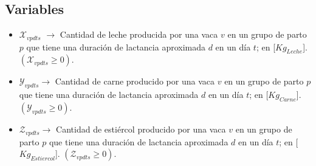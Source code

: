 

\subsection{Variables}
\begin{itemize}
    \item \textbf{$\mathcal{X}_{vpdts}$} $\longrightarrow$ Cantidad de leche producida por una vaca $v$ en un grupo de parto $p$ que tiene una duración de lactancia aproximada $d$ en un día $t$; en [$Kg_{Leche}$]. $\left(\mathcal{X}_{vpdts}\geq 0 \right)$.
    \item \textbf{$\mathcal{Y}_{vpdts}$}$\longrightarrow$ Cantidad de carne producido por una vaca $v$ en un grupo de parto $p$ que tiene una duración de lactancia aproximada $d$ en un día $t$; en [$Kg_{Carne}$].  $\left(\mathcal{Y}_{vpdts}\geq 0 \right)$.

    \item \textbf{$\mathcal{Z}_{vpdts}$}$\longrightarrow$ Cantidad de estiércol producido por una vaca $v$ en un grupo de parto $p$ que tiene una duración de lactancia aproximada $d$ en un día $t$; en [$Kg_{Estiercol}$].  $\left(\mathcal{Z}_{vpdts}\geq 0 \right)$.
\end{itemize}

